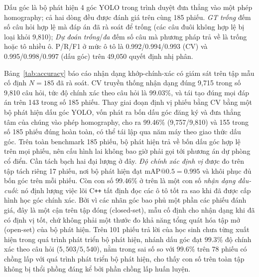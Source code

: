 \documentclass[conference]{IEEEtran}
\begin{document}
\begin{table}[!htb]
\caption{Độ chính xác nhận dạng theo câu hỏi, có giám sát, trên tập $N{=}185$ đã
rà soát.}
\label{tab:accuracy}
\centering
\setlength{\tabcolsep}{3pt}

\vspace{2pt}
\parbox{\columnwidth}{\footnotesize
Dấu góc là bộ phát hiện 4 góc YOLO trong trình duyệt đưa thẳng vào một phép
homography; cả hai dòng đều được đánh giá trên cùng 185 phiếu. \emph{GT trống}
đếm số câu hỏi hợp lệ mà đáp án đã rà soát để trống (các câu đuôi không hợp lệ bị
loại khỏi 9{,}810); \emph{Dự đoán trống}/\emph{đa} đếm số câu mà phương pháp trả
về là trống hoặc tô nhiều ô. P/R/F1 ở mức ô tô là 0.992/0.994/0.993 (CV) và
0.995/0.998/0.997 (dấu góc) trên 49{,}050 quyết định nhị phân.}
\end{table}

Bảng~\ref{tab:accuracy} báo cáo nhận dạng khớp-chính-xác có giám sát trên tập mẫu
cố định $N{=}185$ đã rà soát. CV truyền thống nhận dạng đúng 9{,}715 trong số
9{,}810 câu hỏi, tức độ chính xác theo câu hỏi là 99.03\%, và tái tạo đúng mọi
đáp án trên 143 trong số 185 phiếu. Thay giai đoạn định vị phiếu bằng CV bằng một
bộ phát hiện dấu góc YOLO, vốn phát ra bốn dấu góc đăng ký và đưa thẳng tâm của
chúng vào phép homography, cho ra 99.46\% (9{,}757/9{,}810) và 155 trong số 185
phiếu đúng hoàn toàn, có thể tái lập qua năm máy theo giao thức dấu góc. Trên toàn
benchmark 185 phiếu, bộ phát hiện trả về bốn dấu góc hợp lệ trên mọi phiếu, nên
cấu hình lai không bao giờ phải gọi tới phương án dự phòng cổ điển. Cần tách bạch
hai đại lượng ở đây. \emph{Độ chính xác định vị} được đo trên tập tách riêng 17
phiếu, nơi bộ phát hiện đạt $\mathrm{mAP}@0.5{=}0.995$ và khôi phục đủ bốn góc trên
mỗi phiếu. Còn con số 99.46\% ở trên là một con số \emph{nhận dạng đầu-cuối}: nó
định lượng việc lõi C\texttt{++} tất định đọc các ô tô tốt ra sao khi đã được cấp
hình học góc chính xác. Bởi vì các nhãn góc bao phủ một phần các phiếu đánh giá,
đây là một cận trên tập đóng (closed-set), mẫu cố định cho nhận dạng khi đã có
định vị tốt, chứ không phải một thước đo khả năng tổng quát hóa tập mở (open-set)
của bộ phát hiện. Trên 101 phiếu trả lời của học sinh chưa từng xuất hiện trong
quá trình phát triển bộ phát hiện, nhánh dấu góc đạt $99.3\%$ độ chính xác theo
câu hỏi ($5{,}503/5{,}540$), nằm trong sai số so với $99.6\%$ trên 78 phiếu có
chồng lấp với quá trình phát triển bộ phát hiện, cho thấy con số trên toàn tập
không bị thổi phồng đáng kể bởi phần chồng lấp huấn luyện.
\end{document}
